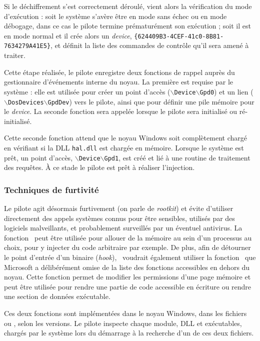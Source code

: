 Si le déchiffrement s'est correctement déroulé, vient alors la vérification du mode d'exécution : soit le système s'avère être en mode sans échec ou en mode débogage, dans ce cas le pilote termine prématurément son exécution ; soit il est en mode normal et il crée alors un \emph{device}, \texttt{\{624409B3-4CEF-41c0-8B81-7634279A41E5\}}, et définit la liste des commandes de contrôle qu'il sera amené à traiter.

Cette étape réalisée, le pilote enregistre deux fonctions de rappel auprès du gestionnaire d'événements interne du noyau.
La première est requise par le système : elle est utilisée pour créer un point d'accès ($\backslash$\texttt{Device}$\backslash$\texttt{Gpd0}) et un lien ($\backslash$\texttt{DosDevices}$\backslash$\texttt{GpdDev}) vers le pilote, ainsi que pour définir une pile mémoire pour le \emph{device}.
La seconde fonction sera appelée lorsque le pilote sera initialisé ou ré-initialisé. 


Cette seconde fonction attend que le noyau Windows soit complètement chargé en vérifiant si la DLL \texttt{hal.dll} est chargée en mémoire. Lorsque le système est prêt, un point d'accès, $\backslash$\texttt{Device}$\backslash$\texttt{Gpd1}, est créé et lié à une routine de traitement des requêtes. 
À ce stade le pilote est prêt à réaliser l'injection.

\subsubsection{Techniques de furtivité}
Le pilote agit désormais furtivement (on parle de \emph{rootkit}) et évite d'utiliser directement des appels systèmes connus pour être sensibles, utilisés par des logiciels malveillants, et probablement surveillés par un éventuel antivirus.
La fonction \ZwA\ peut être utilisée pour allouer de la mémoire au sein d'un processus au choix, pour y injecter du code arbitraire par exemple.
De plus, afin de détourner le point d'entrée d'un binaire (\emph{hook}), \duqu\ voudrait également utiliser la fonction \ZwP\ que Microsoft a délibérément omise de la liste des fonctions accessibles en dehors du noyau. Cette fonction permet de modifier les permissions d'une page mémoire et peut être utilisée pour rendre une partie de code accessible en écriture ou rendre une section de données exécutable.

Ces deux fonctions sont implémentées dans le noyau Windows, dans les fichiers  ou , selon les versions. 
Le pilote inspecte chaque module, DLL et exécutables, chargés par le système lors du démarrage à la recherche d'un de ces deux fichiers.

